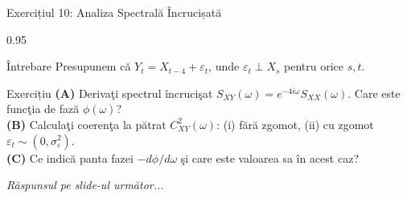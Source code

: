 \documentclass[9pt, aspectratio=169, t]{beamer}
\begin{document}
\begin{frame}{Exercițiul 10: Analiza Spectrală Încrucișată}
    \begin{cminipage}{0.95\textwidth}
    \begin{alertblock}{Întrebare}
        Presupunem că $Y_t = X_{t-4} + \varepsilon_t$, unde $\varepsilon_t \perp X_s$ pentru orice $s, t$.
    \end{alertblock}

    \vspace{0.2cm}

    \begin{block}{Exercițiu}
        \textcolor{MainBlue}{\textbf{(A)}} Derivaţi spectrul încrucişat $S_{XY}(\omega) = e^{-4i\omega}S_{XX}(\omega)$. Care este funcţia de fază $\phi(\omega)$?\\[3pt]
        \textcolor{MainBlue}{\textbf{(B)}} Calculaţi coerenţa la pătrat $C^2_{XY}(\omega)$: (i) fără zgomot, (ii) cu zgomot $\varepsilon_t \sim (0, \sigma^2_\varepsilon)$.\\[3pt]
        \textcolor{MainBlue}{\textbf{(C)}} Ce indică panta fazei $-d\phi/d\omega$ şi care este valoarea sa în acest caz?
    \end{block}

    \vspace{0.2cm}

    \begin{center}
        \textit{Răspunsul pe slide-ul următor...}
    \end{center}
    \end{cminipage}
\end{frame}
\end{document}
